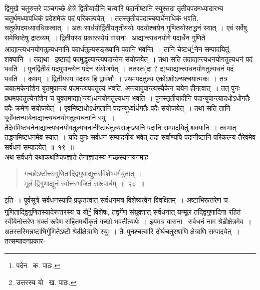 \documentclass[11pt, openany]{book}
\begin{document}
\noindent द्विमुखे चतुरुत्तरे पञ्चगच्छे क्षेत्रे द्वितीयादीनि चत्वारि पदानीष्टानि स्युस्तदा तृतीयपदमध्यादारभ्य चतुर्थमध्यावधिकं प्रदेशमेकं पदं परिकल्पयेत्~। ततस्तृतीयपदाच्चयार्धेनाधिकं भवति, चतुर्थपदमध्यावधिकत्वात्~। अतः सार्धयोर्द्वितीयतृतीययोः पदयोश्चयेन गुणितयोस्तद्धनं स्यात्~। एवं सर्वेषु समेष्विष्टेषु द्रष्टव्यम्~। द्वितीयस्य प्रकारस्येयं वासना \textendash\ आद्यान्त्यधनयोगे पदार्धेन गुणिते आद्यान्त्यधनयोगतुल्यधनानि पदार्धतुल्यसङ्ख्यानि पदानि भवन्ति~। तानि चेष्टध\renewcommand{\thefootnote}{१}\footnote{पदेन \textendash\ क. पाठः.}नेन सम्पादयितुं शक्यानि~। तद्यथा \textendash\ इष्टाद्यं पदमुद्धृत्यान्त्यपदान्तेन संयोजयेत्~। तथा सति तदाद्यान्त्यधनयोगतुल्यधनं पदं भवति~। पुनर्द्वितीयं पदमुपान्त्येन पदेन संयोजयेत्~। ततस्त(दा ? द)प्याद्यान्त्यधनयोगतुल्यधनं पदं भवति~। कथम्~। द्वितीयस्य पदस्य हि द्वावंशौ~। प्रथमपदतुल्य एकोंऽशोऽन्यश्चयात्मकः~। तत्र चयात्मकेनांशेन युतमुपान्त्यं पदमन्त्यपदतुल्यं भवति, अन्त्यादुपान्त्यस्यैकेन चयेन हीनत्वात्~। तत् पुनः प्रथमपदतुल्येनांशेन च युक्तमाद्या(न्त्य)धनयोगतुल्यधनं भवति~। पुनस्तृतीयादीनि पदान्युपान्त्यादधोऽधोगतैः पदैः क्रमेण संयोजयेत्~। एवमिष्टाधोऽर्धगतानि पदान्यूर्ध्वार्धगतैः पदैः संयोजयेत्~। तथा सति तानि पूर्वोक्तन्यायेनाद्यान्त्यधनयोगतुल्यधनानि स्युः~। तैदेवमिष्टधनेनाद्यान्त्यधनयोगतुल्यधनानीष्टार्धतुल्यसङ्ख्यानि पदानि सम्पादयितुं शक्यानि~। तस्मात् तद्धनमिष्टधनमेव स्यात्~। यदि पुनः सर्वधनं सम्पादनीयं भवेत् तदा सर्वाण्यपि पदानीष्टानि परिकल्न्य तैरेवमेव सर्वधनं सम्पादयेत्~॥~१९~॥\\

अथ सर्वधने यथाकथञ्चिज्ज्ञाते तेनाज्ञातस्य गच्छस्यानयनमाह\textendash 

\begin{quote}
{\ab गच्छोऽष्टोत्तरगुणिताद्द्विगुणाद्युत्तरविशेषवर्गयुतात्~।\\
मूलं द्विगुणाद्यूनं स्वोत्तरभजितं सरूपार्धम्~॥~२०~॥}
\end{quote}

इति~। पूर्वसूत्रे सर्वधनस्यापि प्रकृतत्वात् सर्वधनमत्र विशेष्यत्वेन विवक्षितम्~। अष्टाभिरूत्तरेण च गुणिताद्द्विगुणितस्यादेरूत्तरस्य च यो\renewcommand{\thefootnote}{२}\footnote{उत्तरस्य यो \textendash\ ख. पाठः.} विशेषः, तद्वर्गेण संयुक्तात् सर्वधनात् यन्मूलं तद्द्विगुणादिना रहितं स्वीयेनोत्तरेण भक्तं रूपेण सहितमर्धीकृतं गच्छो भवतीत्यर्थः~। इयमत्र वासना \textendash\ सर्वधनं नाम श्रेढीक्षेत्रमेव~। अतस्तस्मिन्नष्टाभिर्गुणितेऽष्टौ श्रेढीक्षेत्राणि स्युः~। तैः पुनश्चत्वारि दीर्घचतुरश्राणि क्षेत्राणि सम्पादयेत्~। तत्सम्पादनप्रकार-

\newpage
\end{document}
